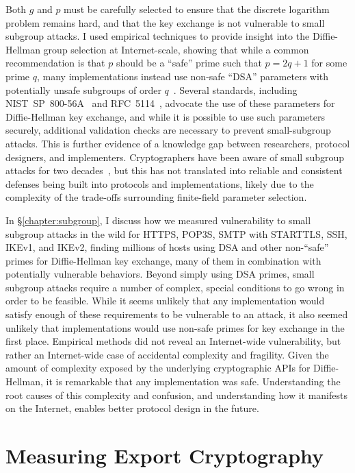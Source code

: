 Both $g$ and $p$ must be carefully selected to ensure that the discrete
logarithm problem remains hard, and that the key exchange is not vulnerable
to small subgroup attacks. I used empirical techniques to provide insight
into the Diffie-Hellman group selection at Internet-scale, showing that while
a common recommendation is that $p$ should be a ``safe'' prime such that $p =
2q+1$ for some prime $q$, many implementations instead use non-safe ``DSA''
parameters with potentially unsafe subgroups of order
$q$~\cite{subgroup-2017}. Several standards, including
NIST~SP~800-56A~\cite{sp800} and RFC~5114~\cite{rfc5114}, advocate the use of
these parameters for Diffie-Hellman key exchange, and while it is possible to
use such parameters securely, additional validation checks are necessary to
prevent small-subgroup attacks. This is further evidence of a knowledge gap
between researchers, protocol designers, and implementers. Cryptographers
have been aware of small subgroup attacks for two decades~\cite{lim-1997},
but this has not translated into reliable and consistent defenses being built
into protocols and implementations, likely due to the complexity of the
trade-offs surrounding finite-field parameter selection.

In \S\ref{chapter:subgroup}, I discuss how we measured vulnerability to small
subgroup attacks in the wild for HTTPS, POP3S, SMTP with STARTTLS, SSH,
IKEv1, and IKEv2, finding millions of hosts using DSA and other non-``safe''
primes for Diffie-Hellman key exchange, many of them in combination with
potentially vulnerable behaviors. Beyond simply using DSA primes, small
subgroup attacks require a number of complex, special conditions to go wrong
in order to be feasible. While it seems unlikely that any implementation
would satisfy enough of these requirements to be vulnerable to an attack, it
also seemed unlikely that implementations would use non-safe primes for key
exchange in the first place. Empirical methods did not reveal an
Internet-wide vulnerability, but rather an Internet-wide case of accidental
complexity and fragility. Given the amount of complexity exposed by the
underlying cryptographic APIs for Diffie-Hellman, it is remarkable that any
implementation was safe. Understanding the root causes of this complexity and
confusion, and understanding how it manifests on the Internet, enables better
protocol design in the future.

\section{Measuring Export Cryptography}

